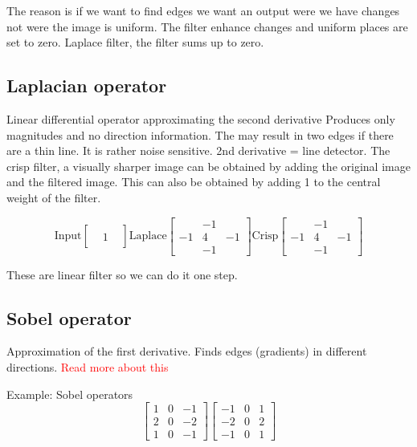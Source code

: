The reason is if we want to find edges we want an output were we have changes not were the image is uniform. The filter enhance changes and uniform places are set to zero. Laplace filter, the filter sums up to zero.  


\subsection*{Laplacian operator}
Linear differential operator approximating the second derivative Produces only magnitudes and no direction information. The may result in two edges if there are a thin line. It is rather noise sensitive. 2nd derivative = line detector. The crisp filter, a visually sharper image can be obtained by adding the original image and the filtered image. This can also be obtained by adding 1 to the central weight of the filter. 

\begin{equation}
\text{Input}
\begin{bmatrix} & & \\ &1 & \\ & &   \end{bmatrix}
\text{Laplace}
\begin{bmatrix} & -1& \\ -1&4 &-1 \\ & -1&   \end{bmatrix}
\text{Crisp}
\begin{bmatrix} & -1& \\ -1&4 &-1 \\ & -1&   \end{bmatrix}
\end{equation}

These are linear filter so we can do it one step. 

\subsection*{Sobel operator}
Approximation of the first derivative. Finds edges (gradients) in different directions. 
\textcolor{red}{Read more about this}

\begin{example}{Example: Sobel operators }
 \begin{equation}
\begin{bmatrix} 1& 0& -1\\ 2& 0& -2\\ 1& 0& -1  \end{bmatrix}
\begin{bmatrix} -1& 0& 1\\ -2& 0& 2\\ -1& 0& 1  \end{bmatrix}
 \end{equation}
\end{example}	

